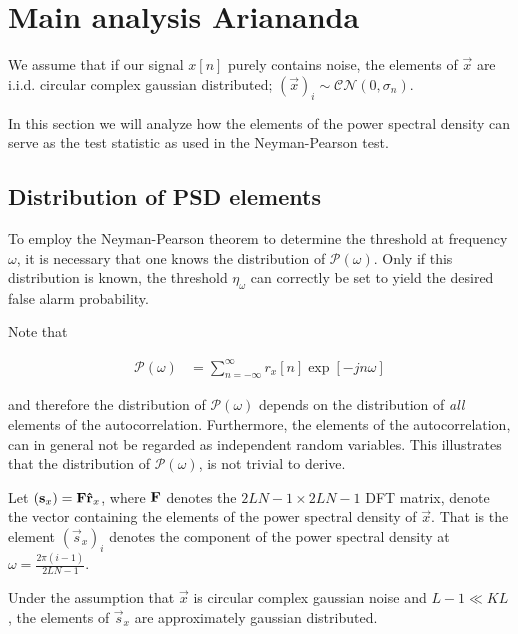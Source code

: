 \documentclass[a4paper, openany, oneside]{memoir}
\begin{document}
\section{Main analysis Ariananda}

We assume that if our signal $x[n]$ purely contains noise, the elements of $\vec{x}$ are i.i.d. circular complex gaussian distributed; $(\vec{x})_i \sim \mathcal{CN}(0,\sigma_n)$. 

In this section we will analyze how the elements of the power spectral density can serve as the test statistic as used in the Neyman-Pearson test. 

\subsection{Distribution of PSD elements}
To employ the Neyman-Pearson theorem to determine the threshold at frequency $\omega$, it is necessary that one knows the distribution of $\mathcal{P}\left(\omega\right)$. Only if this distribution is known, the threshold $\eta_{\omega}$ can correctly be set to yield the desired false alarm probability.

Note that 

\begin{align*}
\mathcal{P}\left(\omega\right) &= \sum_{n=-\infty}^{\infty} r_{x}[n] \exp\left[-jn\omega\right]
\end{align*}

and therefore the distribution of $\mathcal{P}(\omega)$ depends on the distribution of \emph{all} elements of the autocorrelation. Furthermore, the elements of the autocorrelation, can in general not be regarded as independent random variables. This illustrates that the distribution of $\mathcal{P}(\omega)$, is not trivial to derive. 

Let $(\boldsymbol{\mathbf{s}}_x) = \boldsymbol{\mathbf{F}} \boldsymbol{\mathbf{\hat{r}}}_x$, where $\boldsymbol{\mathbf{F}}$ denotes the $2LN-1 \times 2LN-1$ DFT matrix, denote the vector containing the elements of the power spectral density of $\vec{x}$. That is the element $\left(\vec{s}_{x}\right)_{i}$ denotes the component of the power spectral density at $\omega = \frac{2\pi (i-1)}{2LN-1}$.

\begin{blockTheorem}\label{th:psd_distr}
Under the assumption that $\vec{x}$ is circular complex gaussian noise and $L-1 \ll KL$, the elements of $\vec{s}_x$ are approximately gaussian distributed.
\end{blockTheorem}
\end{document}
